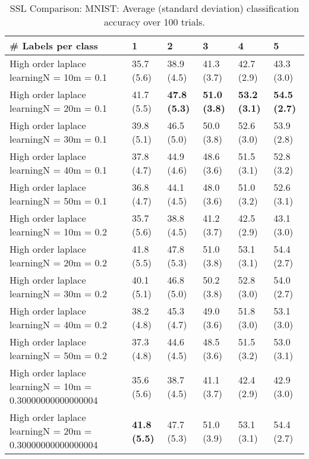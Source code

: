 \documentclass{article}
\begin{document}
\begin{table*}[t!]
\vspace{-3mm}
\caption{SSL Comparison: MNIST: Average (standard deviation) classification accuracy over 100 trials.}
\vspace{-3mm}
\label{tab:SSL Comparison: MNIST}
\vskip 0.15in
\begin{center}
\begin{small}
\begin{sc}
\begin{tabular}{llllll}
\toprule
\# Labels per class&\textbf{1}&\textbf{2}&\textbf{3}&\textbf{4}&\textbf{5}\\
\midrule
High order laplace learningN = 10m = 0.1&35.7 (5.6)      &38.9 (4.5)      &41.3 (3.7)      &42.7 (2.9)      &43.3 (3.0)      \\
High order laplace learningN = 20m = 0.1&41.7 (5.5)      &{\bf 47.8 (5.3)}&{\bf 51.0 (3.8)}&{\bf 53.2 (3.1)}&{\bf 54.5 (2.7)}\\
High order laplace learningN = 30m = 0.1&39.8 (5.1)      &46.5 (5.0)      &50.0 (3.8)      &52.6 (3.0)      &53.9 (2.8)      \\
High order laplace learningN = 40m = 0.1&37.8 (4.7)      &44.9 (4.6)      &48.6 (3.6)      &51.5 (3.1)      &52.8 (3.2)      \\
High order laplace learningN = 50m = 0.1&36.8 (4.7)      &44.1 (4.5)      &48.0 (3.6)      &51.0 (3.2)      &52.6 (3.1)      \\
High order laplace learningN = 10m = 0.2&35.7 (5.6)      &38.8 (4.5)      &41.2 (3.7)      &42.5 (2.9)      &43.1 (3.0)      \\
High order laplace learningN = 20m = 0.2&41.8 (5.5)      &47.8 (5.3)      &51.0 (3.8)      &53.1 (3.1)      &54.4 (2.7)      \\
High order laplace learningN = 30m = 0.2&40.1 (5.1)      &46.8 (5.0)      &50.2 (3.8)      &52.8 (3.0)      &54.0 (2.7)      \\
High order laplace learningN = 40m = 0.2&38.2 (4.8)      &45.3 (4.7)      &49.0 (3.6)      &51.8 (3.0)      &53.1 (3.0)      \\
High order laplace learningN = 50m = 0.2&37.3 (4.8)      &44.6 (4.5)      &48.5 (3.6)      &51.5 (3.2)      &53.0 (3.1)      \\
High order laplace learningN = 10m = 0.30000000000000004&35.6 (5.6)      &38.7 (4.5)      &41.1 (3.7)      &42.4 (2.9)      &42.9 (3.0)      \\
High order laplace learningN = 20m = 0.30000000000000004&{\bf 41.8 (5.5)}&47.7 (5.3)      &51.0 (3.9)      &53.1 (3.1)      &54.4 (2.7)      \\

\end{tabular}
\end{sc}
\end{small}
\end{center}
\end{table*}
\end{document}
